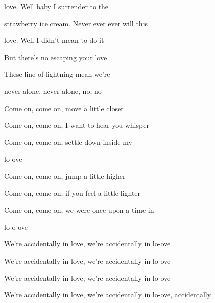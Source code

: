 \begin{song}
\bigskip

love. Well baby I surrender to the \par
{}strawberry ice cream. Never ever ever will this \par
{}love. Well I didn't mean to do it \par
But there's no escaping your love \par

\bigskip

 These line of lightning mean we're \par
{}never alone, never alone, no, no \par

\bigskip

Come on, come on, move a little closer \par
{}Come on, come on, I want to hear you whisper \par
{}Come on, come on, settle down inside my \par
{}lo-ove \par

\bigskip

Come on, come on, jump a little higher \par
{}Come on, come on, if you feel a little lighter \par
{}Come on, come on, we were once upon a time in \par
{}lo-o-ove \par

\bigskip

We're accidentally in love,  we're accidentally in lo-ove \par
We're accidentally in love,  we're accidentally in lo-ove \par
We're accidentally in love,  we're accidentally in lo-ove \par
We're accidentally in love,  we're accidentally in lo-ove, accidentally \par


\end{song}
